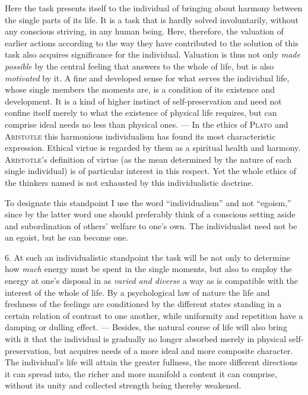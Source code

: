 \documentclass[12pt,a4paper,openany]{book}
\newcommand{\opage}[1]{\marginnote{\footnotesize\textit{[#1]}}}
\begin{document}
Here the task presents itself to the individual of bringing about harmony between the single parts
of its life. It is a task that is hardly solved involuntarily, without any conscious striving, in any
human being. Here, therefore, the valuation of earlier actions according to the way they have
contributed to the solution of this task also acquires significance for the individual. Valuation is
thus not only \textit{made possible} by the central feeling that answers to the whole of life, but is
also \textit{motivated} by it. A fine and developed sense for what serves the individual life, whose
single members the moments are, is a condition of its existence and development. It is a kind of
higher instinct of self-preservation and need not confine itself merely to what the existence of
physical life requires, but can comprise ideal needs no less than physical ones. --- In the ethics of
\textsc{Plato} and \textsc{Aristotle} this harmonious individualism has found its most characteristic
expression. Ethical virtue is regarded by them as a spiritual health and harmony. \textsc{Aristotle}'s
definition of virtue (as the mean determined by the nature of each single individual) is of
particular interest in this respect. Yet the whole ethics of the thinkers named is not exhausted by
this individualistic doctrine.

\opage{34}To designate this standpoint I use the word ``individualism'' and not ``egoism,'' since by the
latter word one should preferably think of a conscious setting aside and subordination of others'
welfare to one's own. The individualist need not be an egoist, but he can become one.

6. At such an individualistic standpoint the task will be not only to determine how \textit{much}
energy must be spent in the single moments, but also to employ the energy at one's disposal in as
\textit{varied and diverse} a way as is compatible with the interest of the whole of life. By a
psychological law of nature the life and freshness of the feelings are conditioned by the different
states standing in a certain relation of contrast to one another, while uniformity and repetition
have a damping or dulling effect. --- Besides, the natural course of life will also bring with it that
the individual is gradually no longer absorbed merely in physical self-preservation, but acquires
needs of a more ideal and more composite character. The individual's life will attain the greater
fullness, the more different directions it can spread into, the richer and more manifold a content it
can comprise, without its unity and collected strength being thereby weakened.
\end{document}
